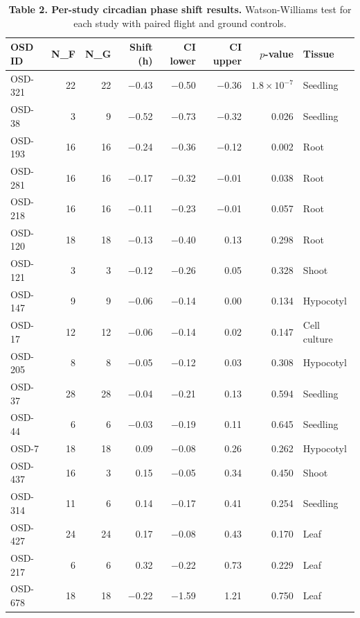 \documentclass[11pt,a4paper]{article}
\begin{document}
\begin{table}[htbp]
\centering
\caption{\textbf{Table 2. Per-study circadian phase shift results.} Watson-Williams test for each study with paired flight and ground controls.}
\small
\begin{tabularx}{\textwidth}{lrrrrrrl}
\toprule
\textbf{OSD ID} & \textbf{N\_F} & \textbf{N\_G} & \textbf{Shift (h)} & \textbf{CI lower} & \textbf{CI upper} & \textbf{$p$-value} & \textbf{Tissue} \\
\midrule
OSD-321 & 22 & 22 & $-$0.43 & $-$0.50 & $-$0.36 & $1.8 \times 10^{-7}$ & Seedling \\
OSD-38 & 3 & 9 & $-$0.52 & $-$0.73 & $-$0.32 & 0.026 & Seedling \\
OSD-193 & 16 & 16 & $-$0.24 & $-$0.36 & $-$0.12 & 0.002 & Root \\
OSD-281 & 16 & 16 & $-$0.17 & $-$0.32 & $-$0.01 & 0.038 & Root \\
OSD-218 & 16 & 16 & $-$0.11 & $-$0.23 & $-$0.01 & 0.057 & Root \\
OSD-120 & 18 & 18 & $-$0.13 & $-$0.40 & 0.13 & 0.298 & Root \\
OSD-121 & 3 & 3 & $-$0.12 & $-$0.26 & 0.05 & 0.328 & Shoot \\
OSD-147 & 9 & 9 & $-$0.06 & $-$0.14 & 0.00 & 0.134 & Hypocotyl \\
OSD-17 & 12 & 12 & $-$0.06 & $-$0.14 & 0.02 & 0.147 & Cell culture \\
OSD-205 & 8 & 8 & $-$0.05 & $-$0.12 & 0.03 & 0.308 & Hypocotyl \\
OSD-37 & 28 & 28 & $-$0.04 & $-$0.21 & 0.13 & 0.594 & Seedling \\
OSD-44 & 6 & 6 & $-$0.03 & $-$0.19 & 0.11 & 0.645 & Seedling \\
OSD-7 & 18 & 18 & 0.09 & $-$0.08 & 0.26 & 0.262 & Hypocotyl \\
OSD-437 & 16 & 3 & 0.15 & $-$0.05 & 0.34 & 0.450 & Shoot \\
OSD-314 & 11 & 6 & 0.14 & $-$0.17 & 0.41 & 0.254 & Seedling \\
OSD-427 & 24 & 24 & 0.17 & $-$0.08 & 0.43 & 0.170 & Leaf \\
OSD-217 & 6 & 6 & 0.32 & $-$0.22 & 0.73 & 0.229 & Leaf \\
OSD-678 & 18 & 18 & $-$0.22 & $-$1.59 & 1.21 & 0.750 & Leaf \\
\bottomrule
\end{tabularx}
\end{table}
\end{document}
